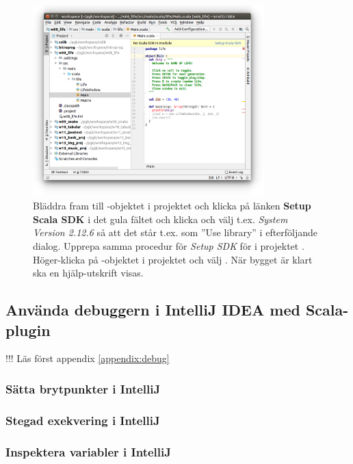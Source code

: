 \begin{figure}
\centering
\includegraphics[width=0.8\textwidth]{../img/intellij/import78-setup-scala-sdk.png}

\caption{Bläddra fram till -objektet i projektet  och klicka på länken \textbf{Setup Scala SDK} i det gula fältet och klicka  och välj t.ex. \emph{System Version 2.12.6} så att det står t.ex.  som ''Use library'' i efterföljande dialog. Upprepa samma procedur för \emph{Setup SDK} för  i projektet . Höger-klicka på -objektet i projektet  och välj . När bygget är klart ska en hjälp-utskrift visas.}
\label{fig:idea:import78-setup-scala-sdk}
\end{figure}


\clearpage

\subsection{Använda debuggern i IntelliJ IDEA med Scala-plugin}

!!! Läs först appendix \ref{appendix:debug}

\subsubsection{Sätta brytpunkter i IntelliJ}\TODO
\subsubsection{Stegad exekvering i IntelliJ}\TODO
\subsubsection{Inspektera variabler i IntelliJ}\TODO
